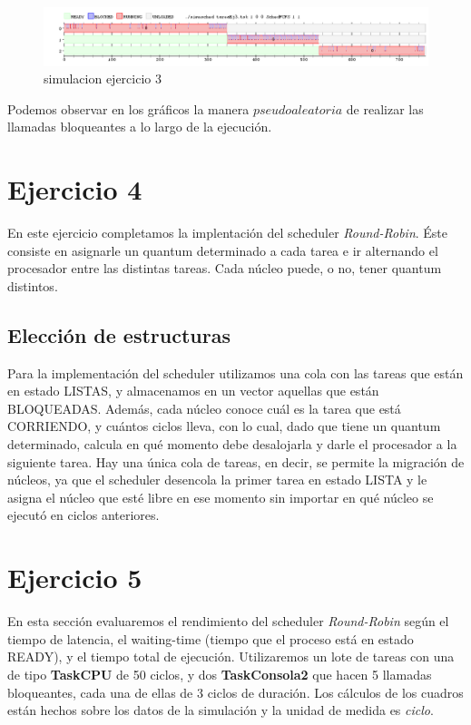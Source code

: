 \documentclass[11pt]{article}
\begin{document}
\begin{enumerate}
    \begin{figure}[H]
      \includegraphics[scale=0.5]{Ejercicio3_3}
      \caption{simulacion ejercicio 3}
    \end{figure}

  Podemos observar en los gráficos la manera $pseudoaleatoria$ de realizar las llamadas bloqueantes a lo largo de la ejecución.

  \newpage 


  \section{Ejercicio 4}

  En este ejercicio completamos la implentación del scheduler \textit{Round-Robin}. Éste consiste en asignarle un quantum determinado a cada tarea e ir alternando el procesador entre las distintas tareas. Cada núcleo puede, o no, tener quantum distintos. 

  \subsection{Elección de estructuras}

  Para la implementación del scheduler utilizamos una cola con las tareas que están en estado LISTAS, y almacenamos en un vector aquellas que están BLOQUEADAS. Además, cada núcleo conoce cuál es la tarea que está CORRIENDO, y cuántos ciclos lleva, con lo cual, dado que tiene un quantum determinado, calcula en qué momento debe desalojarla y darle el procesador a la siguiente tarea.
  Hay una única cola de tareas, en decir, se permite la migración de núcleos, ya que el scheduler desencola la primer tarea en estado LISTA y le asigna el núcleo que esté libre en ese momento sin importar en qué núcleo se ejecutó en ciclos anteriores. 

  \newpage

  \section{Ejercicio 5}


  En esta sección evaluaremos el rendimiento del scheduler \textit{Round-Robin} según el tiempo de latencia, el waiting-time (tiempo que el proceso está en estado READY), y el tiempo total de ejecución. Utilizaremos un lote de tareas con una de tipo \textbf{TaskCPU} de 50 ciclos, y dos \textbf{TaskConsola2} que hacen 5 llamadas bloqueantes, cada una de ellas de 3 ciclos de duración. 
  Los cálculos de los cuadros están hechos sobre los datos de la simulación y la unidad de medida es \textit{ciclo}. \\


\end{enumerate}
\end{document}
